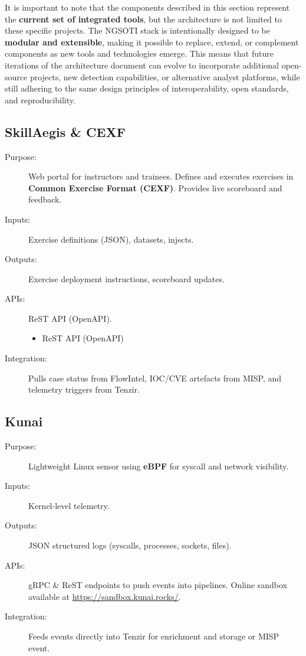 \documentclass[10pt,a4paper]{report}
\begin{document}
It is important to note that the components described in this section
represent the \textbf{current set of integrated tools}, but the architecture is
not limited to these specific projects. The NGSOTI stack is intentionally
designed to be \textbf{modular and extensible}, making it possible to replace,
extend, or complement components as new tools and technologies emerge. This
means that future iterations of the architecture document can evolve to
incorporate additional open-source projects, new detection capabilities, or
alternative analyst platforms, while still adhering to the same design
principles of interoperability, open standards, and reproducibility.

\subsection{SkillAegis \& CEXF}
\begin{description}
  \item[Purpose:] Web portal for instructors and trainees. Defines and executes
        exercises in \textbf{Common Exercise Format (CEXF)}. Provides live
        scoreboard and feedback.
  \item[Inputs:] Exercise definitions (JSON), datasets, injects.
  \item[Outputs:] Exercise deployment instructions, scoreboard updates.
  \item[APIs:] ReST API (OpenAPI).
    \begin{itemize}
        \item ReST API (OpenAPI)
    \end{itemize}
  \item[Integration:] Pulls case status from FlowIntel, IOC/CVE
artefacts from MISP, and telemetry triggers from Tenzir.
\end{description}


\subsection{Kunai}

\begin{description}
  \item[Purpose:] Lightweight Linux sensor using \textbf{eBPF} for syscall and
       network visibility.
  \item[Inputs:] Kernel-level telemetry.
  \item[Outputs:] JSON structured logs (syscalls, processes, sockets, files).
  \item[APIs:] gRPC \& ReST endpoints to push events into pipelines. Online
       sandbox available at \url{https://sandbox.kunai.rocks/}.
  \item[Integration:] Feeds events directly into Tenzir for enrichment and
       storage or MISP event.
\end{description}
\end{document}
